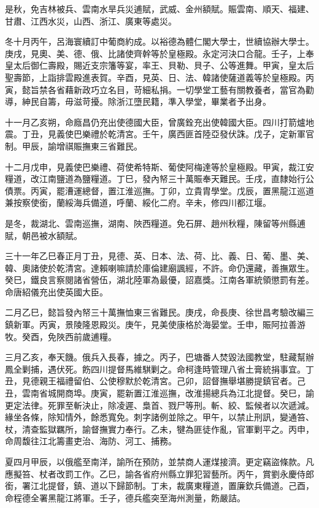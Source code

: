 \begin{pinyinscope}
是秋，免吉林被兵、雲南水旱兵災逋賦，武威、金州額賦。賑雲南、順天、福建、甘肅、江西水災，山西、浙江、廣東等處災。

冬十月丙午，呂海寰續訂中葡商約成。以裕德為體仁閣大學士，世續協辦大學士。庚戌，見奧、美、德、俄、比諸使齊幹等於皇極殿。永定河決口合龍。壬子，上奉皇太后御仁壽殿，賜近支宗籓等宴，率王、貝勒、貝子、公等進舞。甲寅，皇太后聖壽節，上詣排雲殿進表賀。辛酉，見英、日、法、韓諸使薩道義等於皇極殿。丙寅，懿旨禁各省藉新政巧立名目，苛細私捐。一切學堂工藝有關教養者，當官為勸導，紳民自籌，毋滋苛擾。除浙江墮民籍，準入學堂，畢業者予出身。

十一月乙亥朔，命廕昌仍充出使德國大臣，曾廣銓充出使韓國大臣。四川打箭爐地震。丁丑，見義使巴樂禮於乾清宮。壬午，廣西匪首陸亞發伏誅。戊子，定新軍官制。甲辰，諭增祺賑撫東三省難民。

十二月戊申，見義使巴樂禮、荷使希特斯、葡使阿梅達等於皇極殿。甲寅，裁江安糧道，改江南鹽道為鹽糧道。丁巳，發內帑三十萬賑奉天難民。壬戌，直隸始行公債票。丙寅，罷漕運總督，置江淮巡撫。丁卯，立貴胄學堂。戊辰，置黑龍江巡道兼按察使銜，蘭綏海兵備道，呼蘭、綏化二府。辛未，修四川都江堰。

是冬，裁湖北、雲南巡撫，湖南、陜西糧道。免石屏、趙州秋糧，陳留等州縣逋賦，朝邑被水額賦。

三十一年乙巳春正月丁丑，見德、英、日本、法、荷、比、義、日、葡、墨、美、韓、奧諸使於乾清宮。達賴喇嘛請於庫倫建廟諷經，不許。命仍還藏，善撫眾生。癸巳，鐵良言察閱諸省營伍，湖北陸軍為最優，詔嘉獎。江南各軍統領懲罰有差。命唐紹儀充出使英國大臣。

二月乙巳，懿旨發內帑三十萬撫恤東三省難民。庚戌，命長庚、徐世昌考驗改編三鎮新軍。丙寅，景陵隆恩殿災。庚午，見美使康格於海晏堂。壬申，賑阿拉善游牧。癸酉，免陜西前歲逋糧。

三月乙亥，奉天饑。俄兵入長春，據之。丙子，巴塘番人焚毀法國教堂，駐藏幫辦鳳全剿捕，遇伏死。飭四川提督馬維騏剿之。命柯逢時管理八省土膏統捐事宜。丁丑，見德親王福禮留伯、公使穆默於乾清宮。己卯，詔督撫舉堪勝提鎮官者。己丑，雲南省城開商埠。庚寅，罷新置江淮巡撫，改淮揚總兵為江北提督。癸巳，諭更定法律。死罪至斬決止，除凌遲、梟首、戮尸等刑。斬、絞、監候者以次遞減。緣坐各條，除知情外，餘悉寬免。刺字諸例並除之。甲午，以禁止刑訊，變通笞、杖，清查監獄羈所，諭督撫實力奉行。乙未，犍為匪徒作亂，官軍剿平之。丙申，命周馥往江北籌畫吏治、海防、河工、捕務。

夏四月甲辰，以俄艦至南洋，諭所在預防，並禁商人運煤接濟。更定竊盜條款。凡應擬笞、杖者改罰工作。乙巳，諭各省府州縣立罪犯習藝所。丙午，賞劉永慶侍郎銜，署江北提督，鎮、道以下歸節制。丁未，裁廣東糧道，置廉欽兵備道。己酉，命程德全署黑龍江將軍。壬子，德兵艦突至海州測量，飭嚴詰。


\end{pinyinscope}
